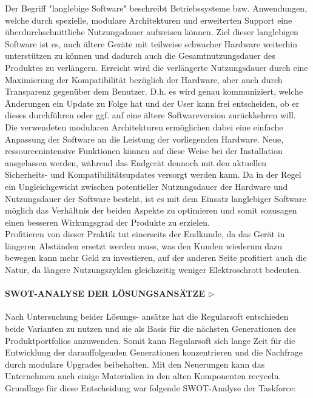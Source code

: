 \documentclass[12pt,titlepage]{article}
\begin{document}
\begin{itemize}
Der Begriff "langlebige Software" beschreibt Betriebssysteme bzw. Anwendungen, welche durch spezielle, modulare Architekturen und erweiterten Support eine überdurchschnittliche Nutzungsdauer aufweisen können. Ziel dieser langlebigen Software ist es, auch ältere Geräte mit teilweise schwacher Hardware weiterhin unterstützen zu können und dadurch auch die Gesamtnutzungsdauer des Produktes zu verlängern. Erreicht wird die verlängerte Nutzungsdauer durch eine Maximierung der Kompatibilität bezüglich der Hardware, aber auch durch Transparenz gegenüber dem Benutzer. D.h. es wird genau kommuniziert, welche Änderungen ein Update zu Folge hat und der User kann frei entscheiden, ob er dieses durchführen oder ggf. auf eine ältere Softwareversion zurückkehren will. Die verwendeten modularen Architekturen ermöglichen dabei eine einfache Anpassung der Software an die Leistung der vorliegenden Hardware. Neue, ressourcenintensive Funktionen können auf diese Weise bei der Installation ausgelassen werden, während das Endgerät dennoch mit den aktuellen Sicherheits- und Kompatibilitätsupdates versorgt werden kann. Da in der Regel ein Ungleichgewicht zwischen potentieller Nutzungsdauer der Hardware und Nutzungsdauer der Software besteht, ist es mit dem Einsatz langlebiger Software möglich das Verhältnis der beiden Aspekte zu optimieren und somit sozusagen einen besseren Wirkungsgrad der Produkte zu erzielen.\\
Profitieren von dieser Praktik tut einerseits der Endkunde, da das Gerät in längeren Abständen ersetzt werden muss, was den Kunden wiederum dazu bewegen kann mehr Geld zu investieren, auf der anderen Seite profitiert auch die Natur, da längere Nutzungszyklen gleichzeitig weniger Elektroschrott bedeuten. 
\end{itemize}


\paragraph{\textbf{SWOT-ANALYSE DER LÖSUNGSANSÄTZE  $\triangleright$}}
Nach Untersuchung beider Lösungs- ansätze hat die Regularsoft entschieden beide Varianten zu nutzen und sie als Basis für die nächsten Generationen des Produktportfolios anzuwenden. Somit kann Regularsoft sich lange Zeit für die Entwicklung der darauffolgenden Generationen konzentrieren und die Nachfrage durch modulare Upgrades beibehalten. Mit den Neuerungen kann das Unternehmen auch einige Materialien in den alten Komponenten recyceln. Grundlage für diese Entscheidung war folgende SWOT-Analyse der Taskforce:\\
\end{document}
